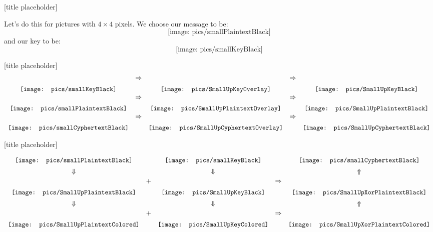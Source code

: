 \documentclass{beamer}
\newcommand{\smKeyBlack}{\mathord{\texttt{[image: pics/smallKeyBlack]}}}
\newcommand{\smMesBlack}{\mathord{\texttt{[image: pics/smallPlaintextBlack]}}}
\newcommand{\smCyphBlack}{\mathord{\texttt{[image: pics/smallCyphertextBlack]}}}
\newcommand{\smUpKeyBlack}{\mathord{\texttt{[image: pics/SmallUpKeyBlack]}}}
\newcommand{\smUpMesBlack}{\mathord{\texttt{[image: pics/SmallUpPlaintextBlack]}}}
\newcommand{\smUpCyphBlack}{\mathord{\texttt{[image: pics/SmallUpCyphertextBlack]}}}
\newcommand{\smUpKeyColored}{\mathord{\texttt{[image: pics/SmallUpKeyColored]}}}
\newcommand{\smUpMesColored}{\mathord{\texttt{[image: pics/SmallUpPlaintextColored]}}}
\newcommand{\smUpKeyOverlay}{\mathord{\texttt{[image: pics/SmallUpKeyOverlay]}}}
\newcommand{\smUpMesOverlay}{\mathord{\texttt{[image: pics/SmallUpPlaintextOverlay]}}}
\newcommand{\smUpCyphOverlay}{\mathord{\texttt{[image: pics/SmallUpCyphertextOverlay]}}}
\newcommand{\smUpXorMesColored}{\mathord{\texttt{[image: pics/SmallUpXorPlaintextColored]}}}
\newcommand{\smUpXorMesBlack}{\mathord{\texttt{[image: pics/SmallUpXorPlaintextBlack]}}}
\begin{document}
\begin{frame}{[title placeholder]}

Let's do this for pictures with $4\times4$ pixels. We choose our message to be:
$$ \smMesBlack $$
and our key to be:
$$ \smKeyBlack $$



\end{frame}



\begin{frame}{[title placeholder]}

\begin{equation*}
\begin{array}{ccccc}
\smKeyBlack & \raisebox{4ex}{$\Rightarrow$} & \smUpKeyOverlay & \raisebox{4ex}{$\Rightarrow$} & \smUpKeyBlack \vspace{0.5em}\\
\smMesBlack & \raisebox{4ex}{$\Rightarrow$} & \smUpMesOverlay & \raisebox{4ex}{$\Rightarrow$} & \smUpMesBlack \vspace{0.5em} \\
\smCyphBlack & \raisebox{4ex}{$\Rightarrow$} & \smUpCyphOverlay & \raisebox{4ex}{$\Rightarrow$} & \smUpCyphBlack
\end{array}
\end{equation*}

\end{frame}



\begin{frame}{[title placeholder]}

\begin{equation*}
\begin{array}{ccccc}
\smMesBlack &  & \smKeyBlack & & \smCyphBlack \vspace{0.5em}\\
\Downarrow &  & \Downarrow& & \Uparrow \vspace{0.5em}\\
\smUpMesBlack & \raisebox{4ex}{+} & \smUpKeyBlack & \raisebox{4ex}{$\Rightarrow$} & \smUpXorMesBlack \vspace{0.5em} \\
\Downarrow &  & \Downarrow& & \Uparrow \vspace{0.5em}\\
\smUpMesColored & \raisebox{4ex}{+} & \smUpKeyColored & \raisebox{4ex}{$\Rightarrow$} & \smUpXorMesColored
\end{array}
\end{equation*}

\end{frame}
\end{document}
